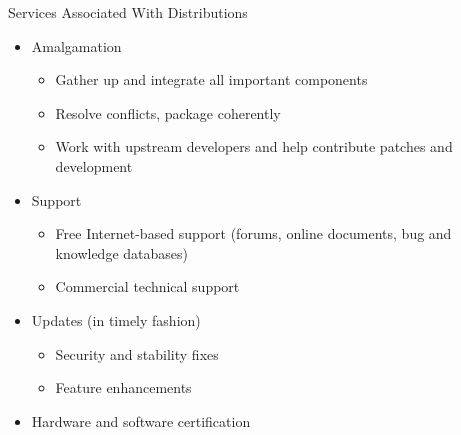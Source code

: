 \begin{frame}
   {Services Associated With Distributions}

   \begin{itemize}
      \item Amalgamation
      \begin{itemize}
         \item Gather up and integrate all important components
         \item Resolve conflicts, package coherently
         \item Work with upstream developers and help contribute
         patches and development
      \end{itemize}
      \item Support
      \begin{itemize}
         \item Free Internet-based support (forums, online
         documents, bug and knowledge databases)
         \item Commercial technical support
      \end{itemize}
      \item Updates (in timely fashion)
      \begin{itemize}
         \item Security and stability fixes
         \item Feature enhancements
      \end{itemize}
      \item Hardware and software certification
   \end{itemize}

\end{frame}

